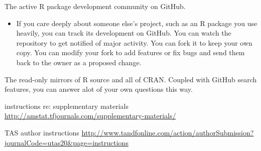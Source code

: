 \documentclass[12pt]{article}
\providecommand{\tightlist}{%
  \setlength{\itemsep}{0pt}\setlength{\parskip}{0pt}}
\begin{document}
The active R package development community on GitHub.

\begin{itemize}
\tightlist
\item
  If you care deeply about someone else's project, such as an R package
  you use heavily, you can track its development on GitHub. You can
  watch the repository to get notified of major activity. You can fork
  it to keep your own copy. You can modify your fork to add features or
  fix bugs and send them back to the owner as a proposed change.
\end{itemize}

The read-only mirrors of R source and all of CRAN. Coupled with GitHub
search features, you can answer alot of your own questions this way.

instructions re: supplementary materials
\url{http://amstat.tfjournals.com/supplementary-materials/}

TAS author instructions
\url{http://www.tandfonline.com/action/authorSubmission?journalCode=utas20\&page=instructions}



\end{document}
